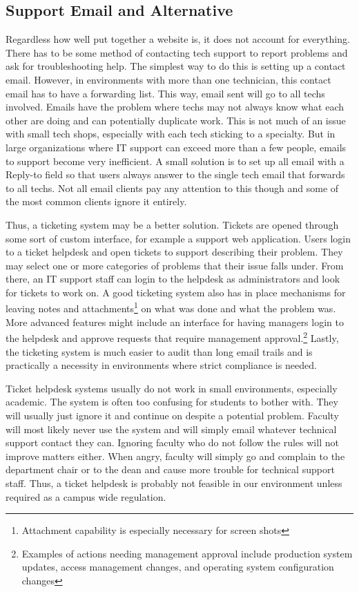 \subsection{Support Email and Alternative}
Regardless how well put together a website is, it does not account for everything.  There has to be some method of contacting tech support to report problems and ask for troubleshooting help.  The simplest way to do this is setting up a contact email.  However, in environments with more than one technician, this contact email has to have a forwarding list.  This way, email sent will go to all techs involved.   Emails have the problem where techs may not always know what each other are doing and can potentially duplicate work.  This is not much of an issue with small tech shops, especially with each tech sticking to a specialty.  But in large organizations where IT support can exceed more than a few people, emails to support become very inefficient.  A small solution is to set up all email with a Reply-to field so that users always answer to the single tech email that forwards to all techs.  Not all email clients pay any attention to this though and some of the most common clients ignore it entirely.

Thus, a ticketing system may be a better solution.  Tickets are opened through some sort of custom interface, for example a support web application.  Users login to a ticket helpdesk and open tickets to support describing their problem.  They may select one or more categories of problems that their issue falls under.  From there, an IT support staff can login to the helpdesk as administrators and look for tickets to work on.  A good ticketing system also has in place mechanisms for leaving notes and attachments\footnote{Attachment capability is especially necessary for screen shots} on what was done and what the problem was.  More advanced features might include an interface for having managers login to the helpdesk and approve requests that require management approval.\footnote{Examples of actions needing management approval include production system updates, access management changes, and operating system configuration changes}  Lastly, the ticketing system is much easier to audit than long email trails and is practically a necessity in environments where strict compliance is needed.   

Ticket helpdesk systems usually do not work in small environments, especially academic.  The system is often too confusing for students to bother with.  They will usually just ignore it and continue on despite a potential problem.  Faculty will most likely never use the system and will simply email whatever technical support contact they can.  Ignoring faculty who do not follow the rules will not improve matters either.  When angry, faculty will simply go and complain to the department chair or to the dean and cause more trouble for technical support staff.  Thus, a ticket helpdesk is probably not feasible in our environment unless required as a campus wide regulation.  

